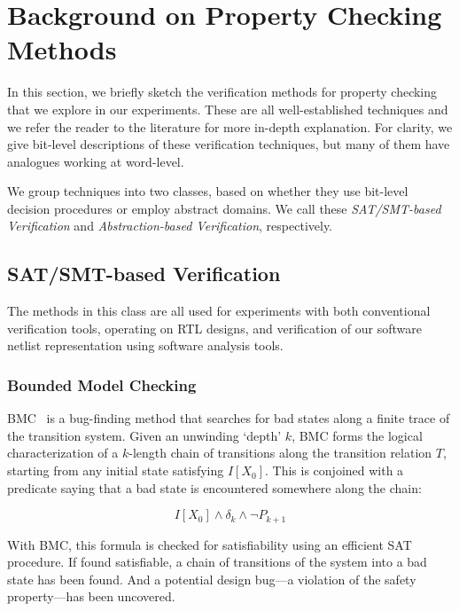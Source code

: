 \section{Background on Property Checking Methods}\label{sec:background}
%
In this section, we briefly sketch the verification methods for property checking that
we explore in our experiments. These are all well-established techniques and we refer 
the reader to the literature for more in-depth explanation.
For clarity, we give bit-level descriptions of these verification techniques, but
 many of them have analogues working at word-level.

We group techniques into two classes, based on whether 
they use bit-level decision procedures or employ abstract domains. We call these 
\textit{SAT/SMT-based Verification} and \textit{Abstraction-based Verification}, 
respectively.

\subsection{SAT/SMT-based Verification}
%
The methods in this class are all used for experiments with both conventional verification tools,
operating on RTL designs, and verification of  our software netlist representation using software analysis tools.

\subsubsection{Bounded Model Checking} 

BMC~\cite{biere} is a bug-finding method that searches for bad states along a finite trace of 
the transition system. 
Given an unwinding `depth' $k$, BMC forms the logical characterization of a 
$k$-length chain of transitions along the transition relation $T$,  starting 
from any initial state satisfying $I[X_0]$. This is conjoined with a predicate saying that a bad state is encountered somewhere along the chain:

\begin{equation}\label{bmc-formula}
I[X_0] \wedge \delta_k \wedge \neg P_{k+1}
\end{equation}

With BMC, this formula is checked for satisfiability using an efficient SAT procedure.
If found satisfiable, a chain of transitions of the system into a bad state has been found.
And a potential design bug---a violation of the safety property---has been uncovered.

